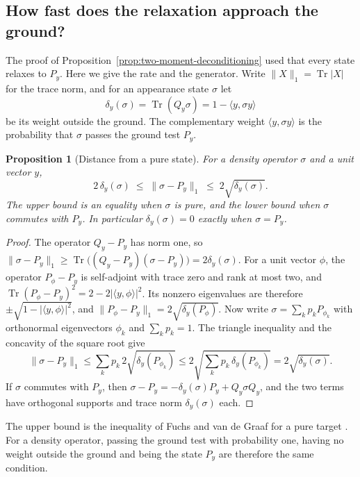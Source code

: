 \documentclass[11pt]{article}
\newtheorem{proposition}{Proposition}[section]
\theoremstyle{definition}
\DeclareMathOperator{\Tr}{Tr}
\begin{document}
\subsection{How fast does the relaxation approach the ground?}
\label{subsec:relaxation-rate}
The proof of Proposition~\ref{prop:two-moment-deconditioning} used that every state relaxes to $P_y$. Here we give the rate and the generator. Write $\|X\|_1=\Tr|X|$ for the trace norm, and for an appearance state $\sigma$ let
\begin{equation}
 \delta_y(\sigma)=\Tr(Q_y\sigma)=1-\langle y,\sigma y\rangle
 \label{eq:relaxation-deviation}
\end{equation}
be its weight outside the ground. The complementary weight $\langle y,\sigma y\rangle$ is the probability that $\sigma$ passes the ground test $P_y$.

\begin{proposition}[Distance from a pure state]
\label{prop:relaxation-pure-distance}
For a density operator $\sigma$ and a unit vector $y$,
\begin{equation}
 2\,\delta_y(\sigma)\;\le\;\|\sigma-P_y\|_1\;\le\;2\sqrt{\delta_y(\sigma)} .
 \label{eq:relaxation-pure-distance}
\end{equation}
The upper bound is an equality when $\sigma$ is pure, and the lower bound when $\sigma$ commutes with $P_y$. In particular $\delta_y(\sigma)=0$ exactly when $\sigma=P_y$.
\end{proposition}
\begin{proof}
The operator $Q_y-P_y$ has norm one, so $\|\sigma-P_y\|_1\ge\Tr\bigl((Q_y-P_y)(\sigma-P_y)\bigr)=2\delta_y(\sigma)$. For a unit vector $\phi$, the operator $P_\phi-P_y$ is self-adjoint with trace zero and rank at most two, and $\Tr(P_\phi-P_y)^2=2-2|\langle y,\phi\rangle|^2$. Its nonzero eigenvalues are therefore $\pm\sqrt{1-|\langle y,\phi\rangle|^2}$, and $\|P_\phi-P_y\|_1=2\sqrt{\delta_y(P_\phi)}$. Now write $\sigma=\sum_k p_kP_{\phi_k}$ with orthonormal eigenvectors $\phi_k$ and $\sum_kp_k=1$. The triangle inequality and the concavity of the square root give
\[
 \|\sigma-P_y\|_1\le\sum_kp_k\,2\sqrt{\delta_y(P_{\phi_k})}
 \le2\sqrt{\textstyle\sum_kp_k\,\delta_y(P_{\phi_k})}=2\sqrt{\delta_y(\sigma)} .
\]
If $\sigma$ commutes with $P_y$, then $\sigma-P_y=-\delta_y(\sigma)P_y+Q_y\sigma Q_y$, and the two terms have orthogonal supports and trace norm $\delta_y(\sigma)$ each.
\end{proof}
The upper bound is the inequality of Fuchs and van de Graaf for a pure target \cite{FuchsVandeGraaf1999}. For a density operator, passing the ground test with probability one, having no weight outside the ground and being the state $P_y$ are therefore the same condition.
\end{document}
